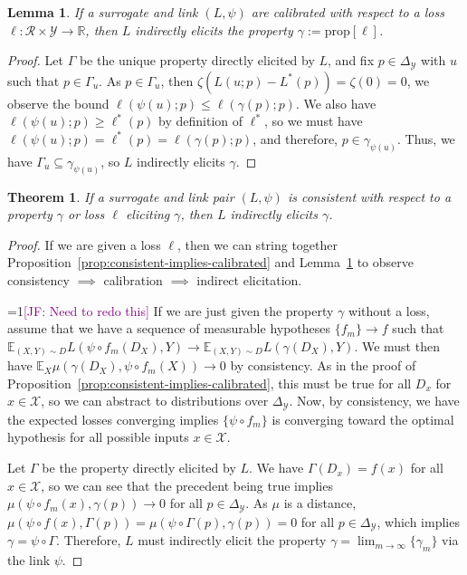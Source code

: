 \documentclass{article}
\newcommand{\Comments}{1}
\newcommand{\mynote}[2]{\ifnum\Comments=1\textcolor{#1}{#2}\fi}
\newcommand{\jessie}[1]{\mynote{purple}{[JF: #1]}}
\newcommand{\reals}{\mathbb{R}}
\newcommand{\simplex}{\Delta_\Y}
\newcommand{\prop}[1]{\mathrm{prop}[#1]}
\newcommand{\E}{\mathbb{E}}
\newcommand{\R}{\mathcal{R}}
\newcommand{\X}{\mathcal{X}}
\newcommand{\Y}{\mathcal{Y}}
\newcommand{\risk}[1]{#1^*}
\newtheorem{theorem}{Theorem}
\newtheorem{lemma}{Lemma}
\begin{document}
\begin{lemma}\label{lem:calib-implies-indir}
	If a surrogate and link $(L, \psi)$ are calibrated with respect to a loss $\ell:\R \times\Y \to \reals$, then $L$ indirectly elicits the property $\gamma := \prop{\ell}$.
\end{lemma}
\begin{proof}
	Let $\Gamma$ be the unique property directly elicited by $L$, and fix $p \in \simplex$ with $u$ such that $p \in \Gamma_u$.
	As $p \in \Gamma_u$, then $\zeta(L(u;p) - \risk{L}(p)) = \zeta(0) = 0$, we observe the bound $\ell(\psi(u); p) \leq \ell(\gamma(p); p)$.
	We also have $\ell(\psi(u); p) \geq \risk{\ell}(p)$ by definition of $\risk{\ell}$, so we must have $\ell(\psi(u);p) = \risk{\ell}(p) = \ell(\gamma(p); p)$, and therefore, $p \in \gamma_{\psi(u)}$.
	Thus, we have $\Gamma_u \subseteq \gamma_{\psi(u)}$, so $L$ indirectly elicits $\gamma$.
\end{proof}

\begin{theorem}\label{thm:consistent-implies-indir-elic}
	If a surrogate and link pair $(L, \psi)$ is consistent with respect to a property $\gamma$ or loss $\ell$ eliciting $\gamma$, then $L$ indirectly elicits $\gamma$.
\end{theorem}
\begin{proof}
If we are given a loss $\ell$, then we can string together Proposition~\ref{prop:consistent-implies-calibrated} and Lemma~\ref{lem:calib-implies-indir} to observe consistency $\implies$ calibration $\implies$ indirect elicitation.

\jessie{Need to redo this}
If we are just given the property $\gamma$ without a loss, assume that we have a sequence of measurable hypotheses $\{f_m\} \to f$ such that $\E_{(X,Y) \sim D} L(\psi \circ f_m(D_X), Y) \to \E_{(X,Y) \sim D} L(\gamma(D_X), Y)$.
We must then have $\E_X \mu(\gamma(D_X), \psi \circ f_m(X)) \to 0$ by consistency.
As in the proof of Proposition~\ref{prop:consistent-implies-calibrated}, this must be true for all $D_x$ for $x \in \X$, so we can abstract to distributions over $\simplex$.
Now, by consistency, we have the expected losses converging implies $\{\psi \circ f_m\}$ is converging toward the optimal hypothesis for all possible inputs $x \in \X$.

Let $\Gamma$ be the property directly elicited by $L$.
We have $\Gamma(D_x) = f(x)$ for all $x \in \X$, so we can see that the precedent being true implies $\mu(\psi \circ f_m(x), \gamma(p)) \to 0$ for all $p\in \simplex$.
As $\mu$ is a distance, $\mu(\psi \circ f(x), \Gamma(p)) = \mu(\psi \circ \Gamma(p), \gamma(p)) = 0$ for all $p \in \simplex$, which implies $\gamma = \psi \circ \Gamma$.
Therefore, $L$ must indirectly elicit the property $\gamma = \lim_{m \to \infty} \{\gamma_m\}$ via the link $\psi$.
\end{proof}
\end{document}
